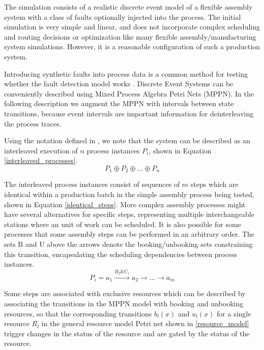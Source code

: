 \documentclass[procedia]{easychair}
\begin{document}
The simulation consists of a realistic discrete event model of a flexible assembly system with a class of faults optionally injected into the process.
The initial simulation is very simple and linear, and does not incorporate complex scheduling and routing decisions or optimization like many flexible assembly/manufacturing system simulations\cite{donath1988flexible}.
However, it is a reasonable configuration of such a production system.

Introducing synthetic faults into process data is a common method for testing whether the fault detection model works \cite{able2016model}.
Discrete Event Systems can be conveniently
described using Mixed Process Algebra Petri Nets (MPPN)\cite{falkman2001modeling}. In the following description we augment the MPPN with intervals between state transitions,
because event intervals are important information for deinterleaving the process traces.

Using the notation defined in \cite{falkman2001combined}, we note that the system can be described as an interleaved execution of $ n $ process instances $ P_i $, shown in
Equation \ref{interleaved_processes}.
\begin{equation}
 P_1 \oplus P_2 \oplus ... \oplus P_n
 \label{interleaved_processes}
\end{equation}

The interleaved process instances consist of sequences of $ m $ steps which are identical within a production batch in the simple assembly process being tested, shown in Equation \ref{identical_steps}.
More complex assembly processes might have several alternatives for specific steps, representing multiple interchangeable stations where an unit of work can be scheduled.
It is also possible for some processes that some assembly steps can be performed in an arbitrary order.
The sets B and U above the arrows denote the booking/unbooking sets constraining this transition, encapsulating the scheduling dependencies between process instances.
\begin{equation}
 P_i = a_1 \xrightarrow{B_2 \& U_1} a_2 \rightarrow ... \rightarrow a_m
 \label{identical_steps}
\end{equation}

Some steps are associated with exclusive resources which can be described by associating the transitions in the MPPN model with booking and unbooking resources, so that
the corresponding transitions $ b_l(x) $ and $ u_l(x) $ for a single resource $ R_l $ in the general resource model Petri net shown in \ref{resource_model} trigger changes in the status of the resource and
are gated by the status of the resource.
\end{document}

